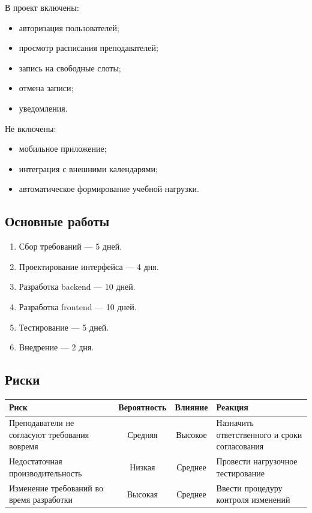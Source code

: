 \documentclass[12pt,a4paper]{article}
\begin{document}
В проект включены:
\begin{itemize}
    \item авторизация пользователей;
    \item просмотр расписания преподавателей;
    \item запись на свободные слоты;
    \item отмена записи;
    \item уведомления.
\end{itemize}

Не включены:
\begin{itemize}
    \item мобильное приложение;
    \item интеграция с внешними календарями;
    \item автоматическое формирование учебной нагрузки.
\end{itemize}

\subsection*{Основные работы}

\begin{enumerate}
    \item Сбор требований --- 5 дней.
    \item Проектирование интерфейса --- 4 дня.
    \item Разработка backend --- 10 дней.
    \item Разработка frontend --- 10 дней.
    \item Тестирование --- 5 дней.
    \item Внедрение --- 2 дня.
\end{enumerate}

\subsection*{Риски}

\begin{center}
\begin{tabular}{|p{5cm}|c|c|p{5cm}|}
\hline
Риск & Вероятность & Влияние & Реакция \\
\hline
Преподаватели не согласуют требования вовремя & Средняя & Высокое & Назначить ответственного и сроки согласования \\
\hline
Недостаточная производительность & Низкая & Среднее & Провести нагрузочное тестирование \\
\hline
Изменение требований во время разработки & Высокая & Среднее & Ввести процедуру контроля изменений \\
\hline
\end{tabular}
\end{center}
\end{document}
